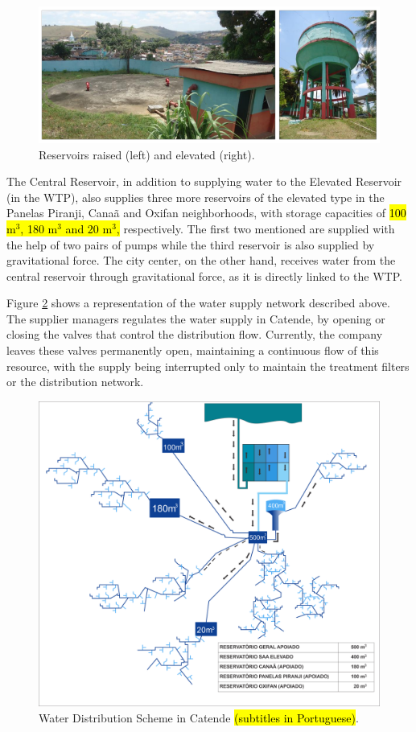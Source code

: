 \documentclass{singlecol}
\theoremstyle{TH}{
\newtheorem{lemma}{Lemma}
\newtheorem{theorem}[lemma]{Theorem}
\newtheorem{corrolary}[lemma]{Corrolary}
\newtheorem{conjecture}[lemma]{Conjecture}
\newtheorem{proposition}[lemma]{Proposition}
\newtheorem{claim}[lemma]{Claim}
\newtheorem{stheorem}[lemma]{Wrong Theorem}
\newtheorem{algorithm}{Algorithm}
}
\theoremstyle{THrm}{
\newtheorem{definition}{Definition}[section]
\newtheorem{question}{Question}[section]
\newtheorem{remark}{Remark}
\newtheorem{scheme}{Scheme}
}
\theoremstyle{THhit}{
\newtheorem{case}{Case}[section]
}
\begin{document}
\begin{figure}[h]
\caption{Reservoirs raised (left) and elevated (right).} 
\label{fig:reservoiresCatende}
\centering
\includegraphics[width=\textwidth]{figures/reservoirs.png}
\end{figure}

The Central Reservoir, in addition to supplying water to the Elevated Reservoir (in the WTP), also supplies three more reservoirs of the elevated type in the Panelas Piranji, Canaã and Oxifan neighborhoods, with storage capacities of \hl{100 m$^3$, 180 m$^3$ and 20 m$^3$,} respectively. The first two mentioned are supplied with the help of two pairs of pumps while the third reservoir is also supplied by gravitational force. The city center, on the other hand, receives water from the central reservoir through gravitational force, as it is directly linked to the WTP. 

Figure \ref{fig:WDSCatende} shows a representation of the water supply network described above. The supplier managers regulates the water supply in Catende, by opening or closing the valves that control the distribution flow. Currently, the company leaves these valves permanently open, maintaining a continuous flow of this resource, with the supply being interrupted only to maintain the treatment filters or the distribution network. 

\begin{figure}[h]
\caption{Water Distribution Scheme in Catende \hl{(subtitles in Portuguese)}.}
\label{fig:WDSCatende}
\centering
\includegraphics[width=\textwidth]{figures/esquemaDist.png}
\end{figure}
 
\end{document}
